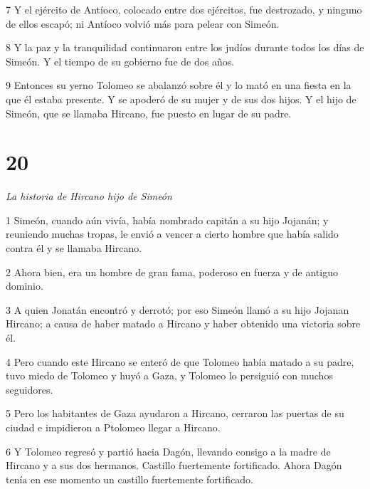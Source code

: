 \par 7 Y el ejército de Antíoco, colocado entre dos ejércitos, fue destrozado, y ninguno de ellos escapó; ni Antíoco volvió más para pelear con Simeón.

\par 8 Y la paz y la tranquilidad continuaron entre los judíos durante todos los días de Simeón. Y el tiempo de su gobierno fue de dos años.

\par 9 Entonces su yerno Tolomeo se abalanzó sobre él y lo mató en una fiesta en la que él estaba presente. Y se apoderó de su mujer y de sus dos hijos. Y el hijo de Simeón, que se llamaba Hircano, fue puesto en lugar de su padre.

\par [Aquí termina la historia tal como se presenta en los dos libros que normalmente se adjuntan a nuestras Biblias.]

\chapter{20}

\par \textit{La historia de Hircano hijo de Simeón}

\par 1 Simeón, cuando aún vivía, había nombrado capitán a su hijo Jojanán; y reuniendo muchas tropas, le envió a vencer a cierto hombre que había salido contra él y se llamaba Hircano.

\par 2 Ahora bien, era un hombre de gran fama, poderoso en fuerza y ​​de antiguo dominio.

\par 3 A quien Jonatán encontró y derrotó; por eso Simeón llamó a su hijo Jojanan Hircano; a causa de haber matado a Hircano y haber obtenido una victoria sobre él.

\par 4 Pero cuando este Hircano se enteró de que Tolomeo había matado a su padre, tuvo miedo de Tolomeo y huyó a Gaza, y Tolomeo lo persiguió con muchos seguidores.

\par 5 Pero los habitantes de Gaza ayudaron a Hircano, cerraron las puertas de su ciudad e impidieron a Ptolomeo llegar a Hircano.

\par 6 Y Tolomeo regresó y partió hacia Dagón, llevando consigo a la madre de Hircano y a sus dos hermanos. Castillo fuertemente fortificado. Ahora Dagón tenía en ese momento un castillo fuertemente fortificado.

